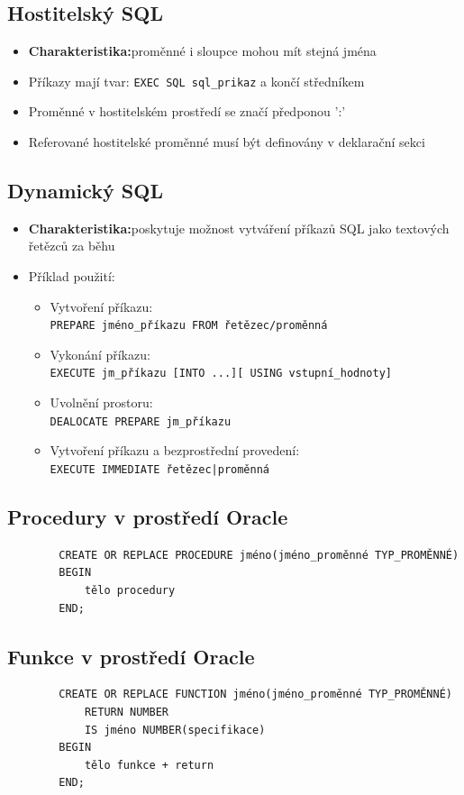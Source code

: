 \documentclass[a4paper,10pt]{article}
\newcommand{\pojem}[2]{\item \textbf{#1:}\quad #2}
\begin{document}
		\subsection{Hostitelský SQL}
			\begin{itemize}
				\pojem{Charakteristika}{proměnné i sloupce mohou mít stejná jména}
				\item Příkazy mají tvar: \texttt{EXEC SQL sql\_prikaz} a končí středníkem
				\item Proměnné v hostitelském prostředí se značí předponou ':'
				\item Referované hostitelské proměnné musí být definovány v deklarační sekci
			\end{itemize}
		\subsection{Dynamický SQL}
			\begin{itemize}
				\pojem{Charakteristika}{poskytuje možnost vytváření příkazů SQL jako textových řetězců za běhu}
				\item Příklad použití:
				\begin{itemize}
					\item Vytvoření příkazu: \\ \texttt{PREPARE jméno\_příkazu FROM řetězec/proměnná}
­ 					\item Vykonání příkazu: \\ \texttt{EXECUTE jm\_příkazu [INTO ...][ USING vstupní\_hodnoty]}
­ 					\item Uvolnění prostoru: \\ \texttt{DEALOCATE PREPARE jm\_příkazu}
					\item Vytvoření příkazu a bezprostřední provedení: \\ \texttt{EXECUTE IMMEDIATE řetězec|proměnná}
				\end{itemize}
			\end{itemize}

		\subsection{Procedury v prostředí Oracle}
		\begin{verbatim}
		CREATE OR REPLACE PROCEDURE jméno(jméno_proměnné TYP_PROMĚNNÉ) 
		BEGIN
		    tělo procedury
		END;	
		\end{verbatim}

		\subsection{Funkce v prostředí Oracle}
		\begin{verbatim}
		CREATE OR REPLACE FUNCTION jméno(jméno_proměnné TYP_PROMĚNNÉ) 
		    RETURN NUMBER
		    IS jméno NUMBER(specifikace)
		BEGIN
		    tělo funkce + return
		END;
		\end{verbatim}
\end{document}
